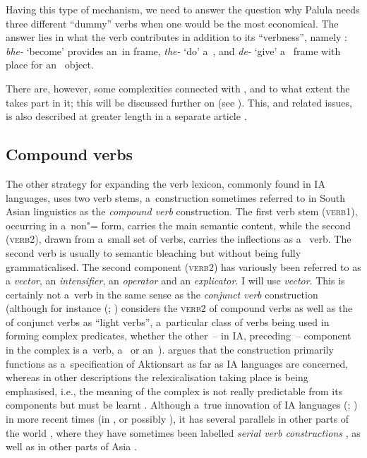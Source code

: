 \begin{exe}
Having this type of mechanism, we need to answer the question why Palula needs three different ``dummy'' verbs when one would be the most economical. The answer lies in what the verb contributes in addition to its ``verbness'', namely : \textit{bhe-} `become' provides an~in frame, \textit{the-} `do' a~, and \textit{de-} `give' a~ frame with place for an~ object. 


There are, however, some complexities connected with , and to what extent the  takes part in it; this will be discussed further on (see ). This, and related issues, is also described at greater length in a separate article \citep{liljegren2010}.


\subsection{Compound verbs}
\label{subsec:8-6-2}

The other strategy for expanding the verb lexicon, commonly found in IA languages, uses two verb stems, a~construction sometimes referred to in South Asian linguistics \citep[326]{masica1991} as the \textit{compound verb} construction. The first verb stem (\textsc{verb1}), occurring in a~non"= form, carries the main semantic content, while the second (\textsc{verb2}), drawn from a~small set of verbs, carries the inflections as a~ verb. The second verb is usually  to semantic bleaching but without being fully grammaticalised. The second component (\textsc{verb2}) has variously been referred to as a \textit{vector}, an \textit{intensifier}, an \textit{operator} and an \textit{explicator}. I will use \textit{vector}. This is certainly not a~verb  in the same sense as the \textit{conjunct verb} construction (although for instance \citeauthor{butt1993} (\citeyear[31]{butt1993}; \citeyear[49]{butt2010}) considers the \textsc{verb2} of compound verbs as well as the  of conjunct verbs as ``light verbs'', a~particular class of verbs being used in forming complex predicates, whether the other~-- in IA, preceding~-- component in the complex is a~verb, a~ or an~). \citet[326--330]{masica1991} argues that the construction primarily functions as a~specification of Aktionsart as far as IA languages are concerned, whereas in other descriptions the relexicalisation taking place is being emphasised, i.e., the meaning of the complex is not really predictable from its components but must be learnt \citep[143]{schmidt1999}. Although a~true innovation of IA languages (\citealt[326]{masica1991}; \citealt{hook1977}) in more recent times (in \iliNIA, or possibly \iliMIA), it has several parallels in other parts of the world \citep[348--349]{hook1977}, where they have sometimes been labelled \textit{serial verb constructions} \citep{ansaldo2006}, as well as in other parts of Asia \citep[559]{ebert2006}. 




\end{exe}
